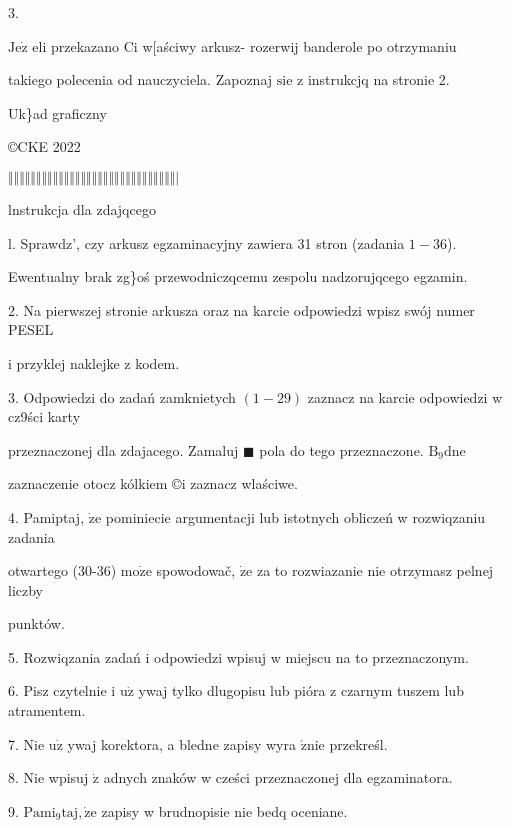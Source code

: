 \documentclass[a4paper,12pt]{article}
\begin{document}
3.

$\mathrm{J}\mathrm{e}\dot{\mathrm{z}}$ eli przekazano Ci w[aściwy arkusz- rozerwij banderole po otrzymaniu

takiego polecenia od nauczyciela. Zapoznaj $\mathrm{s}\mathrm{i}\mathrm{e}$ z instrukcjq na stronie 2.

Uk\}ad graficzny

\copyright CKE 2022

$\Vert\Vert\Vert\Vert\Vert\Vert\Vert\Vert\Vert\Vert\Vert\Vert\Vert\Vert\Vert\Vert\Vert\Vert\Vert\Vert\Vert\Vert\Vert\Vert\Vert\Vert\Vert\Vert\Vert\Vert|$




lnstrukcja dla zdajqcego

l. Sprawdz', czy arkusz egzaminacyjny zawiera 31 stron (zadania $1-36$).

Ewentualny brak zg\}oś przewodniczqcemu zespolu nadzorujqcego egzamin.

2. Na pierwszej stronie arkusza oraz na karcie odpowiedzi wpisz swój numer PESEL

i przyklej naklejke z kodem.

3. Odpowiedzi do zadań zamknietych $(1-29)$ zaznacz na karcie odpowiedzi w cz9ści karty

przeznaczonej dla zdajacego. Zamaluj $\blacksquare$ pola do tego przeznaczone. $\mathrm{B}_{9}\mathrm{d}\mathrm{n}\mathrm{e}$

zaznaczenie otocz kólkiem \copyright i zaznacz wlaściwe.

4. Pamiptaj, $\dot{\mathrm{z}}\mathrm{e}$ pominiecie argumentacji lub istotnych obliczeń w rozwiqzaniu zadania

otwartego (30-36) $\mathrm{m}\mathrm{o}\dot{\mathrm{z}}\mathrm{e}$ spowodowač, $\dot{\mathrm{z}}\mathrm{e}$ za to rozwiazanie nie otrzymasz pelnej liczby

punktów.

5. Rozwiqzania zadań i odpowiedzi wpisuj w miejscu na to przeznaczonym.

6. Pisz czytelnie i $\mathrm{u}\dot{\mathrm{z}}$ ywaj tylko dlugopisu lub pióra z czarnym tuszem lub atramentem.

7. Nie $\mathrm{u}\dot{\mathrm{z}}$ ywaj korektora, a bledne zapisy wyra $\acute{\mathrm{z}}\mathrm{n}\mathrm{i}\mathrm{e}$ przekreśl.

8. Nie wpisuj $\dot{\mathrm{z}}$ adnych znaków w cześci przeznaczonej dla egzaminatora.

9. $\mathrm{P}\mathrm{a}\mathrm{m}\mathrm{i}_{9}\mathrm{t}\mathrm{a}\mathrm{j}, \dot{\mathrm{z}}\mathrm{e}$ zapisy w brudnopisie nie bedq oceniane.
\end{document}
